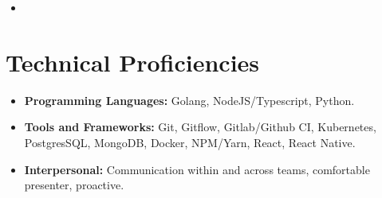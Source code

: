 \documentclass[11pt,a4paper,sans]{moderncv}        %
\begin{document}
\vspace{5pt}

\begin{itemize}

\item{}

\end{itemize}

\vspace{2pt}

\section{Technical Proficiencies}

\vspace{4pt}

\begin{itemize}

\item \textbf{Programming Languages:} Golang, NodeJS/Typescript, Python.

\vspace{4pt}

\item \textbf{Tools and Frameworks:} Git, Gitflow, Gitlab/Github CI, Kubernetes, PostgresSQL, MongoDB, Docker, NPM/Yarn, React, React Native.

\vspace{4pt}

\item \textbf{Interpersonal:} Communication within and across teams, comfortable presenter, proactive.


\end{itemize}

\nocite{*}



\end{document}

